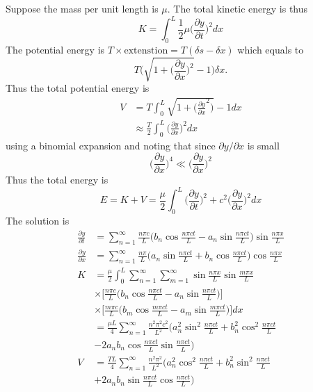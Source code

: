 \documentclass[a4paper]{article}
\begin{document}
Suppose the mass per unit length is \(\mu\). The total kinetic energy is thus
\[
  K = \int_{0}^{L} \frac{1}{2} \mu \Big(\frac{\partial y}{\partial t} \Big)^2 dx
\]
The potential energy is \(T \times \text{extenstion} = T(\delta s - \delta x)\) which equals to
\[
  T \Bigg(\sqrt{1+ \Big( \frac{\partial y}{\partial x} \Big)^2} -1 \Bigg) \delta x.
\]
Thus the total potential energy is
\begin{align*}
  V &= T \int_{0}^{L} \sqrt{1+ \Big( \frac{\partial y}{\partial x}^2 \Big)} -1 dx \\
    &\approx \frac{T}{2} \int_{0}^{L} \Big(\frac{\partial y}{\partial x} \Big)^2 dx
\end{align*}
using a binomial expansion and noting that since \(\partial y /\partial x\) is small
\[
  \Big(\frac{\partial y}{\partial x} \Big)^4 \ll \Big(\frac{\partial y}{\partial x} \Big)^2
\]
Thus the total energy is
\[
  E = K + V = \frac{\mu}{2} \int_{0}^{L} \Big( \frac{\partial y}{\partial t} \Big)^2 + c^2 \Big( \frac{\partial y}{\partial x} \Big)^2 dx
\]
The solution is
\begin{align*}
  \frac{\partial y}{\partial t} &= \sum_{n=1}^{\infty} \frac{n\pi c}{L} \Big( b_n \cos \frac{n\pi ct}{L} - a_n \sin \frac{n\pi ct}{L} \Big) \sin \frac{n\pi x}{L} \\
  \frac{\partial y}{\partial x} &= \sum_{n=1}^{\infty} \frac{n\pi }{L} \Big( a_n \sin \frac{n\pi ct}{L} + b_n \cos \frac{n\pi ct}{L} \Big) \cos \frac{n\pi x}{L} \\ 
  K &= \frac{\mu}{2} \int_{0}^{L} \sum_{n=1}^{\infty} \sum_{m=1}^{\infty} \sin \frac{n\pi x}{L } \sin \frac{m\pi x}{L } \\
                                &\times \Big[ \frac{n\pi c}{L} \Big( b_n \cos \frac{n\pi ct}{L} - a_n \sin \frac{n\pi ct}{L} \Big) \Big] \\
                                &\times \Big[ \frac{m\pi c}{L} \Big( b_m \cos \frac{m\pi ct}{L} - a_m \sin \frac{m\pi ct}{L} \Big) \Big] dx\\
                                &= \frac{\mu L}{4} \sum_{n=1}^{\infty} \frac{n^2\pi^2c^2}{L^2} \Big( a_n^2 \sin^2 \frac{n\pi ct}{L} +b_n^2 \cos^2 \frac{n\pi ct}{L} \\
                                & -2a_nb_n \cos \frac{n\pi ct}{L} \sin \frac{n\pi ct}{L} \Big) \\
  V &= \frac{TL}{4} \sum_{n=1}^{\infty} \frac{n^2\pi^2}{L^2} \Big( a_n^2 \cos^2 \frac{n\pi ct}{L} + b_n^2\sin^2 \frac{n\pi ct}{L} \\
                                & +2a_nb_n \sin \frac{n\pi ct}{L} \cos \frac{n\pi ct}{L} \Big)
\end{align*}
\end{document}
